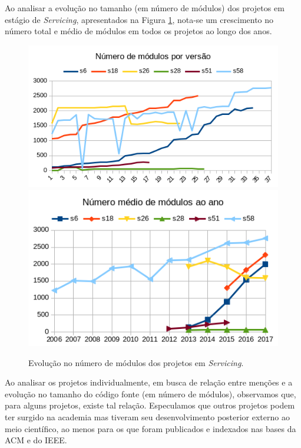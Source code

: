 Ao analisar a evolução no tamanho (em número de módulos) 
dos projetos em estágio de {\it Servicing}, apresentados na Figura \ref{modules-evolution-servicing},
nota-se um crescimento no número total e médio de módulos
em todos os projetos ao longo dos anos.

\begin{figure}[h]
  \center
  \includegraphics[scale=0.6]{imagens/modules-evolution-servicing.png}
  \includegraphics[scale=0.6]{imagens/modules-evolution-average.png}
  \caption{Evolução no número de módulos dos projetos em \textit{Servicing}.}
  \label{modules-evolution-servicing}
\end{figure}

Ao analisar os projetos individualmente, em busca de relação entre
menções e a evolução no tamanho do código fonte (em número de módulos), 
observamos que, para alguns projetos, existe tal relação.
Especulamos que outros projetos podem ter surgido na academia mas 
tiveram seu desenvolvimento posterior externo ao meio científico, 
ao menos para os que foram publicados e indexados nas bases da ACM e do IEEE.

